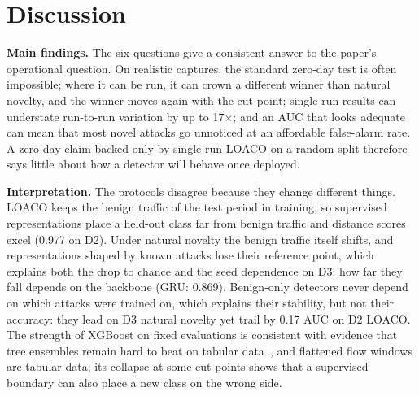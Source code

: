 \documentclass[conference]{IEEEtran}
\begin{document}
\section{Discussion}
\label{sec:disc}
\textbf{Main findings.} The six questions give a consistent answer to the paper's operational question. On realistic captures, the standard zero-day test is often impossible; where it can be run, it can crown a different winner than natural novelty, and the winner moves again with the cut-point; single-run results can understate run-to-run variation by up to 17$\times$; and an AUC that looks adequate can mean that most novel attacks go unnoticed at an affordable false-alarm rate. A zero-day claim backed only by single-run LOACO on a random split therefore says little about how a detector will behave once deployed.

\textbf{Interpretation.} The protocols disagree because they change different things. LOACO keeps the benign traffic of the test period in training, so supervised representations place a held-out class far from benign traffic and distance scores excel (0.977 on D2). Under natural novelty the benign traffic itself shifts, and representations shaped by known attacks lose their reference point, which explains both the drop to chance and the seed dependence on D3; how far they fall depends on the backbone (GRU: 0.869). Benign-only detectors never depend on which attacks were trained on, which explains their stability, but not their accuracy: they lead on D3 natural novelty yet trail by 0.17 AUC on D2 LOACO. The strength of XGBoost on fixed evaluations is consistent with evidence that tree ensembles remain hard to beat on tabular data~\cite{grinsztajn2022}, and flattened flow windows are tabular data; its collapse at some cut-points shows that a supervised boundary can also place a new class on the wrong side.
\end{document}
